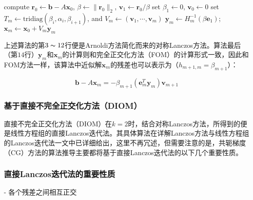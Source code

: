 \documentclass[UTF8,nofonts]{ctexart}
\begin{document}
\begin{algorithm}[H]
compute $\boldsymbol{r}_0\gets\boldsymbol{b}-A\boldsymbol{x}_0$, $\beta\gets\|\boldsymbol{r}_0\|_2$, $\boldsymbol{v}_1\gets\boldsymbol{r}_0/\beta$\;
set $\beta_1\gets0$, $\boldsymbol{v}_0\gets0$\;
set $T_m\gets\text{tridiag}(\beta_i,\alpha_i,\beta_{i+1})$, and $V_m\gets(\boldsymbol{v}_1,\cdots,\boldsymbol{v}_m)$\;
$\boldsymbol{y}_m\gets H_m^{-1}(\beta\boldsymbol{e}_1)$; $\boldsymbol{x}_m\gets\boldsymbol{x}_0+V_m\boldsymbol{y}_m$\;
\end{algorithm}

上述算法的第$3\thicksim12$行便是Arnoldi方法简化而来的对称Lanczos方法。算法最后（第$14$行）$\boldsymbol{y}_m$和$\boldsymbol{x}_m$的计算则和完全正交化方法（FOM）的计算形式一致，因此和FOM方法一样，该算法中近似解$\boldsymbol{x}_m$的残差也可以表示为（$h_{m+1,m}=\beta_{m+1}$）：

\begin{equation}
\label{eq:rm}
\boldsymbol{b}-A\boldsymbol{x}_m=-\beta_{m+1}\left(\boldsymbol{e}^T_m\boldsymbol{y}_m\right)\boldsymbol{v}_{m+1}
\end{equation}

\subsubsection*{基于直接不完全正交化方法（DIOM）}

直接不完全正交化方法（DIOM）在$k=2$时，结合对称Lanczos方法，所得到的便是线性方程组的直接Lanczos迭代法。其具体算法在详解Lanczos方法与线性方程组的Lanczos迭代法一文中已详细给出，这里不再冗述，但需要注意的是，共轭梯度（CG）方法的算法推导主要都将基于直接Lanczos迭代法的以下几个重要性质。

\subsubsection*{直接Lanczos迭代法的重要性质}

- 各个残差之间相互正交
\end{document}
